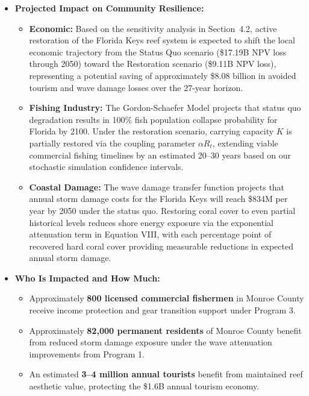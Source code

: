 \documentclass[10pt,letterpaper]{article}
\begin{document}
\begin{itemize}

    \item \textbf{Projected Impact on Community Resilience:}
    \begin{itemize}
        \item \textbf{Economic:} Based on the sensitivity analysis in Section~4.2, active restoration of the Florida Keys reef system is expected to shift the local economic trajectory from the Status Quo scenario (\$17.19B NPV loss through 2050) toward the Restoration scenario (\$9.11B NPV loss), representing a potential saving of approximately \$8.08 billion in avoided tourism and wave damage losses over the 27-year horizon.
        \item \textbf{Fishing Industry:} The Gordon-Schaefer Model projects that status quo degradation results in 100\% fish population collapse probability for Florida by 2100. Under the restoration scenario, carrying capacity $K$ is partially restored via the coupling parameter $\alpha R_t$, extending viable commercial fishing timelines by an estimated 20--30 years based on our stochastic simulation confidence intervals.
        \item \textbf{Coastal Damage:} The wave damage transfer function projects that annual storm damage costs for the Florida Keys will reach \$834M per year by 2050 under the status quo. Restoring coral cover to even partial historical levels reduces shore energy exposure via the exponential attenuation term in Equation VIII, with each percentage point of recovered hard coral cover providing measurable reductions in expected annual storm damage.
    \end{itemize}

    \item \textbf{Who Is Impacted and How Much:}
    \begin{itemize}
        \item Approximately \textbf{800 licensed commercial fishermen} in Monroe County receive income protection and gear transition support under Program 3.
        \item Approximately \textbf{82,000 permanent residents} of Monroe County benefit from reduced storm damage exposure under the wave attenuation improvements from Program 1.
        \item An estimated \textbf{3--4 million annual tourists} benefit from maintained reef aesthetic value, protecting the \$1.6B annual tourism economy.
    \end{itemize}


\end{itemize}
\end{document}
